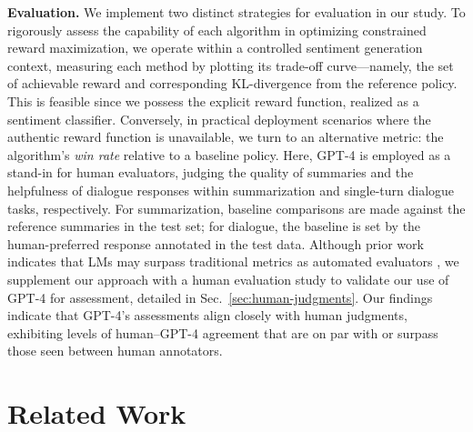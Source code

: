\textbf{Evaluation.} We implement two distinct strategies for evaluation in our study. To rigorously assess the capability of each algorithm in optimizing constrained reward maximization, we operate within a controlled sentiment generation context, measuring each method by plotting its trade-off curve—namely, the set of achievable reward and corresponding KL-divergence from the reference policy. This is feasible since we possess the explicit reward function, realized as a sentiment classifier. Conversely, in practical deployment scenarios where the authentic reward function is unavailable, we turn to an alternative metric: the algorithm’s \textit{win rate} relative to a baseline policy. Here, GPT-4 is employed as a stand-in for human evaluators, judging the quality of summaries and the helpfulness of dialogue responses within summarization and single-turn dialogue tasks, respectively. For summarization, baseline comparisons are made against the reference summaries in the test set; for dialogue, the baseline is set by the human-preferred response annotated in the test data. Although prior work indicates that LMs may surpass traditional metrics as automated evaluators \citep{Chen2023ExploringTU}, we supplement our approach with a human evaluation study to validate our use of GPT-4 for assessment, detailed in Sec.~\ref{sec:human-judgments}. Our findings indicate that GPT-4’s assessments align closely with human judgments, exhibiting levels of human–GPT-4 agreement that are on par with or surpass those seen between human annotators.

\section{Related Work}


